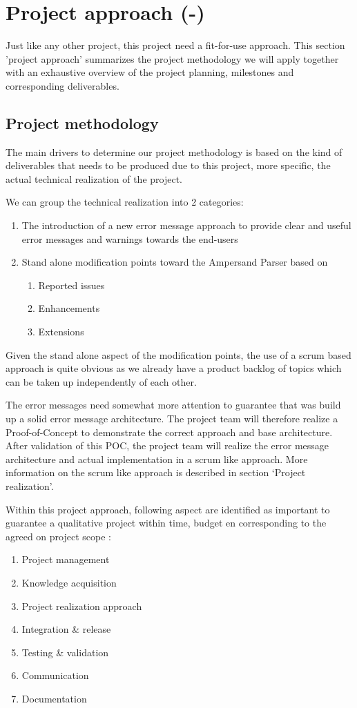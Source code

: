 \section{Project approach (-)}
\label{sec:project-approach}
Just like any other project, this project need a fit-for-use approach. 
This section 'project approach' summarizes the project methodology we will apply together with an exhaustive overview of the project planning, milestones and corresponding deliverables.
\subsection{Project methodology}
The main drivers to determine our project methodology is based on the kind of deliverables that needs to be produced due to this project, more specific, the actual technical realization of the project.

We can group the technical realization into 2 categories:
\begin{enumerate}
	\item The introduction of a new error message approach to provide clear and useful error messages and warnings towards the end-users
	\item Stand alone modification points toward the Ampersand Parser based on
	\begin{enumerate}
		\item Reported issues
		\item Enhancements
		\item Extensions
	\end {enumerate}
\end {enumerate}

Given the stand alone aspect of the modification points, the use of a scrum based approach is quite obvious as we already have a product backlog of topics which can be taken up independently of each other. 

The error messages need somewhat more attention to guarantee that was build up a solid error message architecture. The project team will therefore realize a Proof-of-Concept to demonstrate the correct approach and base architecture. After validation of this POC, the project team will realize the error message architecture and actual implementation in a scrum like approach.
More information on the scrum like approach is described in section ‘Project realization’.


Within this project approach, following aspect are identified as important to guarantee a qualitative project within time, budget en corresponding to the agreed on project scope : 
\begin{enumerate}
	\item Project management
	\item Knowledge acquisition 
	\item Project realization approach
	\item Integration \& release
	\item Testing & validation
	\item Communication
	\item Documentation
\end {enumerate}

